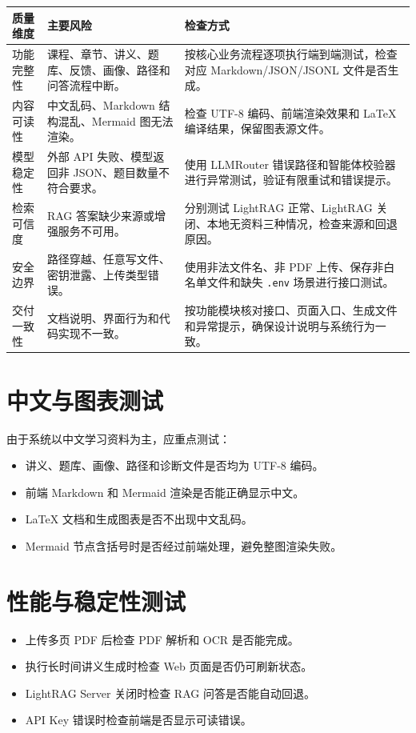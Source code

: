 \documentclass[UTF8,fontset=windows,zihao=-4,openany]{ctexrep}
\begin{document}
\begin{longtable}{p{}p{}p{}}
\toprule
质量维度 & 主要风险 & 检查方式\\
\midrule
功能完整性 & 课程、章节、讲义、题库、反馈、画像、路径和问答流程中断。 & 按核心业务流程逐项执行端到端测试，检查对应 Markdown/JSON/JSONL 文件是否生成。\\
内容可读性 & 中文乱码、Markdown 结构混乱、Mermaid 图无法渲染。 & 检查 UTF-8 编码、前端渲染效果和 LaTeX 编译结果，保留图表源文件。\\
模型稳定性 & 外部 API 失败、模型返回非 JSON、题目数量不符合要求。 & 使用 LLMRouter 错误路径和智能体校验器进行异常测试，验证有限重试和错误提示。\\
检索可信度 & RAG 答案缺少来源或增强服务不可用。 & 分别测试 LightRAG 正常、LightRAG 关闭、本地无资料三种情况，检查来源和回退原因。\\
安全边界 & 路径穿越、任意写文件、密钥泄露、上传类型错误。 & 使用非法文件名、非 PDF 上传、保存非白名单文件和缺失 \texttt{.env} 场景进行接口测试。\\
交付一致性 & 文档说明、界面行为和代码实现不一致。 & 按功能模块核对接口、页面入口、生成文件和异常提示，确保设计说明与系统行为一致。\\
\bottomrule
\end{longtable}

\section{中文与图表测试}

由于系统以中文学习资料为主，应重点测试：
\begin{itemize}
  \item 讲义、题库、画像、路径和诊断文件是否均为 UTF-8 编码。
  \item 前端 Markdown 和 Mermaid 渲染是否能正确显示中文。
  \item LaTeX 文档和生成图表是否不出现中文乱码。
  \item Mermaid 节点含括号时是否经过前端处理，避免整图渲染失败。
\end{itemize}

\section{性能与稳定性测试}

\begin{itemize}
  \item 上传多页 PDF 后检查 PDF 解析和 OCR 是否能完成。
  \item 执行长时间讲义生成时检查 Web 页面是否仍可刷新状态。
  \item LightRAG Server 关闭时检查 RAG 问答是否能自动回退。
  \item API Key 错误时检查前端是否显示可读错误。
\end{itemize}
\end{document}
